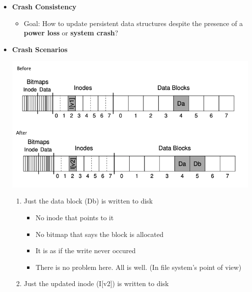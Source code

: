 \documentclass[12pt]{article}
\begin{document}
\begin{itemize}
    \item \textbf{Crash Consistency}

    \begin{itemize}
        \item Goal: How to update persistent data structures despite the presence of
        a \textbf{power loss} or \textbf{system crash}?
    \end{itemize}

    \item \textbf{Crash Scenarios}

    \begin{center}
    \includegraphics[width=\linewidth]{images/midterm_1_solution_19.png}
    \end{center}


    \begin{enumerate}[1)]
        \item Just the data block (Db) is written to disk

        \bigskip

        \begin{itemize}
            \item No inode that points to it
            \item No bitmap that says the block is allocated
            \item It is as if the write never occured
            \item There is no problem here. All is well. (In file system's point of view)
        \end{itemize}

        \bigskip

        \item Just the updated inode (I[v2]) is written to disk

        \bigskip


\end{enumerate}
\end{itemize}
\end{document}
